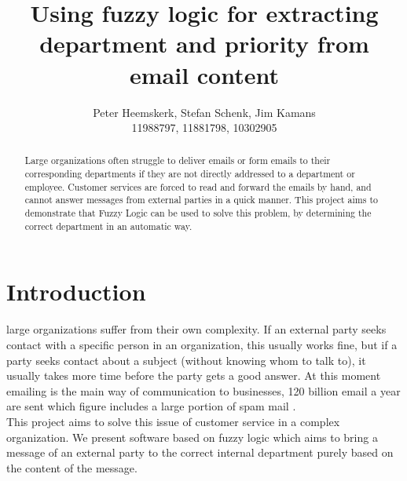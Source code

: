 \documentclass[journal]{IEEEtran}
\begin{document}
\title{Using fuzzy logic for extracting department and priority from email content}
\author{Peter Heemskerk, Stefan Schenk, Jim Kamans\\11988797, 11881798, 10302905}


\maketitle

\begin{abstract}
Large organizations often struggle to deliver emails or form emails to their corresponding departments if they are not directly addressed to a department or employee. Customer services are forced to read and forward the emails by hand, and cannot answer messages from external parties in a quick manner. This project aims to demonstrate that Fuzzy Logic can be used to solve this problem, by determining the correct department in an automatic way.

\end{abstract}

\section{Introduction}
 large organizations suffer from their own complexity. If an external party seeks contact with a specific person in an organization, this usually works fine, but if a party seeks contact about a subject (without knowing whom to talk to), it usually takes more time before the party gets a good answer. At this moment emailing is the main way of communication to businesses, 120 billion email a year are sent which figure includes a large portion of spam mail \cite{email_statistics}.\\


This project aims to solve this issue of customer service in a complex organization. We present software based on fuzzy logic which aims to bring a message of an external party to the correct internal department purely based on the content of the message.
\end{document}
